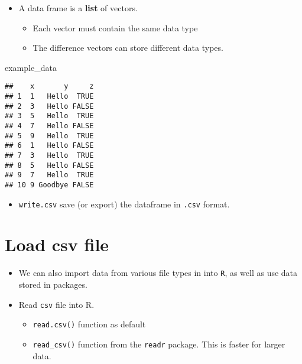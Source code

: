 \documentclass[]{book}
\newenvironment{Shaded}{\begin{snugshade}}{\end{snugshade}}
\newcommand{\NormalTok}[1]{#1}
\providecommand{\tightlist}{%
  \setlength{\itemsep}{0pt}\setlength{\parskip}{0pt}}
\begin{document}
\begin{itemize}
\tightlist
\item
  A data frame is a \textbf{list} of vectors.

  \begin{itemize}
  \tightlist
  \item
    Each vector must contain the same data type
  \item
    The difference vectors can store different data types.
  \end{itemize}
\end{itemize}

\begin{Shaded}
\begin{Highlighting}[]
\NormalTok{example_data}
\end{Highlighting}
\end{Shaded}

\begin{verbatim}
##    x       y     z
## 1  1   Hello  TRUE
## 2  3   Hello FALSE
## 3  5   Hello  TRUE
## 4  7   Hello FALSE
## 5  9   Hello  TRUE
## 6  1   Hello FALSE
## 7  3   Hello  TRUE
## 8  5   Hello FALSE
## 9  7   Hello  TRUE
## 10 9 Goodbye FALSE
\end{verbatim}

\begin{itemize}
\tightlist
\item
  \texttt{write.csv} save (or export) the dataframe in \texttt{.csv}
  format.
\end{itemize}

\section{Load csv file}\label{load-csv-file}

\begin{itemize}
\tightlist
\item
  We can also import data from various file types in into \texttt{R}, as
  well as use data stored in packages.
\item
  Read \texttt{csv} file into R.

  \begin{itemize}
  \tightlist
  \item
    \texttt{read.csv()} function as default
  \item
    \texttt{read\_csv()} function from the \texttt{readr} package. This
    is faster for larger data.
  \end{itemize}
\end{itemize}
\end{document}
